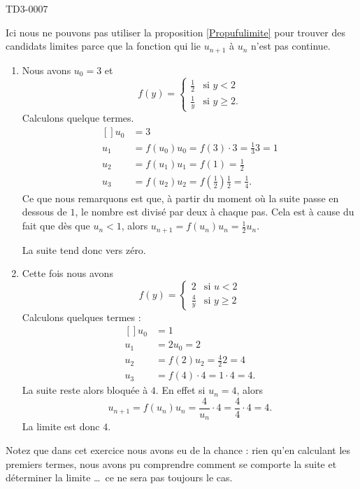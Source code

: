 
\begin{corrige}{TD3-0007}

	Ici nous ne pouvons pas utiliser la proposition \ref{Propufulimite} pour trouver des candidats limites parce que la fonction qui lie $u_{n+1}$ à $u_n$ n'est pas continue.
	\begin{enumerate}
		\item
			Nous avons $u_0=3$ et
			\begin{equation}
				f(y)=\begin{cases}
					\frac{ 1 }{2}	&	\text{si }y<2\\
					\frac{1}{ y }	&	 \text{si }y\geq 2.
				\end{cases}
			\end{equation}
			Calculons quelque termes.		
			\begin{equation}
				\begin{aligned}[]
					u_0&=3\\
					u_1&=f(u_0)u_0=f(3)\cdot 3=\frac{1}{ 3 }3=1\\
					u_2&=f(u_1)u_1=f(1)=\frac{ 1 }{2}\\
					u_3&=f(u_2)u_2=f(\frac{ 1 }{2})\frac{ 1 }{2}=\frac{1}{ 4 }.
				\end{aligned}
			\end{equation}
			Ce que nous remarquons est que, à partir du moment où la suite passe en dessous de $1$, le nombre est divisé par deux à chaque pas. Cela est à cause du fait que dès que $u_n<1$, alors $u_{n+1}=f(u_n)u_n=\frac{ 1 }{2}u_n$.

			La suite tend donc vers zéro.
		\item
			Cette fois nous avons
			\begin{equation}
				f(y)=\begin{cases}
					2	&	\text{si }u<2\\
					\frac{ 4 }{ y }	&	 \text{si }y\geq 2
				\end{cases}
			\end{equation}
			Calculons quelques termes :
			\begin{equation}
				\begin{aligned}[]
					u_0&=1\\
					u_1&=2u_0=2\\
					u_2&=f(2)u_2=\frac{ 4 }{ 2 }2=4\\
					u_3&=f(4)\cdot 4=1\cdot 4=4.
				\end{aligned}
			\end{equation}
			La suite reste alors bloquée à $4$. En effet si $u_n=4$, alors
			\begin{equation}
				u_{n+1}=f(u_n)u_n=\frac{ 4 }{ u_n }\cdot 4=\frac{ 4 }{ 4 }\cdot 4=4.
			\end{equation}
			La limite est donc $4$.
	\end{enumerate}
	
	Notez que dans cet exercice nous avons eu de la chance : rien qu'en calculant les premiers termes, nous avons pu comprendre comment se comporte la suite et déterminer la limite \ldots\ ce ne sera pas toujours le cas.

\end{corrige}
